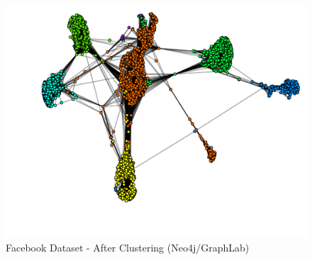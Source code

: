 \begin{figure}[H]
	\centering
	\includegraphics[scale=0.4, trim=0 0 20 0]{Images/after_facebook.pdf}
	\caption{Facebook Dataset - After Clustering (Neo4j/GraphLab)\label{fig:fb-after}}
\end{figure}